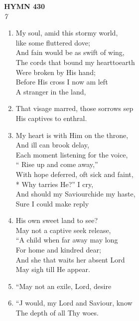 \documentclass[11pt,a4paper]{article}
\begin{document}
\newpage
\begin{center}
    {\Large \textbf{HYMN 430}}
    \\
    \textit{7}
\end{center}
\vspace{1em}

\begin{enumerate}
    \item My soul, amid this stormy world, \\
        like some fluttered dove; \\
        And fain would be as swift of wing, \\
        The cords that bound my hearttoearth \\
        Were broken by His hand; \\
        Before His cross I now am left \\
        A stranger in the land,

    \item That visage marred, those sorrows sep \\
        His captives to enthral.

    \item My heart is with Him on the throne, \\
        And ill can brook delay, \\
        Each moment listening for the voice, \\
        `` Rise up and come away,'' \\
        With hope deferred, oft sick and faint, \\
        * Why tarries He?'' I cry, \\
        And should my Saviourchide my haste, \\
        Sure I could make reply

    \item His own sweet land to see? \\
        May not a captive seek release, \\
        ``A child when far away may long \\
        For home and kindred dear; \\
        And she that waits her absent Lord \\
        May sigh till He appear.

    \item ``May not an exile, Lord, desire

    \item ``J would, my Lord and Saviour, know \\
        The depth of all Thy woes.


\end{enumerate}
\end{document}
